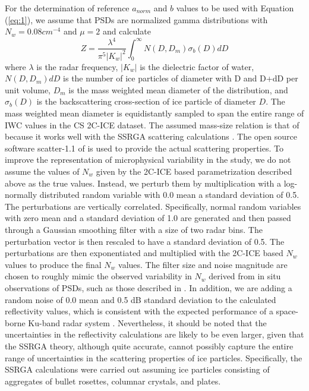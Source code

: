 \documentclass{ametsocV6.1}
\begin{document}
For the determination of reference $a_{norm}$ and $b$ values to be used with Equation (\ref{eq:1}), we assume that 
PSDs are normalized gamma  distributions with $N_w=0.08cm^{-4}$ and $\mu=2$ and calculate 
\begin{equation}
 Z=\frac {\lambda ^4} {\pi ^5 |K_w|^2} \int_0^{\infty} N(D,D_m) \sigma _b(D) dD
\end{equation}
where $\lambda$ is the radar frequency, $|K_w|$ is the dielectric factor of water, $N(D,D_m) dD$ is the number 
of ice particles of diameter with D and D+dD per unit volume, $D_m$ is the mass weighted mean diameter of the 
distribution, and $\sigma _b(D)$ is the backscattering cross-section of ice particle of diameter $D$. The mass 
weighted mean diameter is equidistantly sampled to span the entire range of IWC values in the CS 2C-ICE dataset.
The assumed mass-size relation is that of \cite{brown1995improved} because it works well with the 
SSRGA scattering calculations \citep{heymsfield2022impacts}.  The open source software scatter-1.1 of \citep{scatter-1.1}
is used to provide the actual scattering properties.   
To improve the representation of microphysical variability in the study, we do not assume the values of $N_w$ given
by the 2C-ICE based parametrization described above as the true values. Instead, we perturb them by multiplication 
with a log-normally distributed random variable with 0.0 mean a standard deviation of 0.5.  The 
perturbations are vertically correlated. Specifically, normal random variables with zero mean and a standard deviation
of 1.0 are generated and then passed through a Gaussian smoothing filter \citep{nixon2019} with a size of two radar bins. The perturbation
vector is then rescaled to have a standard deviation of 0.5.  The perturbations are then exponentiated and multiplied
with the 2C-ICE based $N_w$ values to produce the final $N_w$ values.  The filter size and noise magnitude are chosen
to roughly mimic the observed variability in $N_w$ derived from in situ observations of PSDs, such as those described
in \cite{heymsfield2022impacts}. In addition, we are adding a random noise of
0.0 mean and 0.5 dB standard deviation to the calculated reflectivity values, which is consistent with the expected
performance of a space-borne Ku-band radar system \citep{takahashi2008}.  Nevertheless, it should be noted that the
uncertainties in the reflectivity calculations are likely to be even larger, given that the SSRGA theory, although 
quite accurate, cannot possibly capture the entire range of uncertainties in the scattering properties of ice particles.
Specifically, the SSRGA calculations were carried out assuming ice particles consisting of aggregates of 
bullet rosettes, columnar crystals, and plates.
\end{document}
